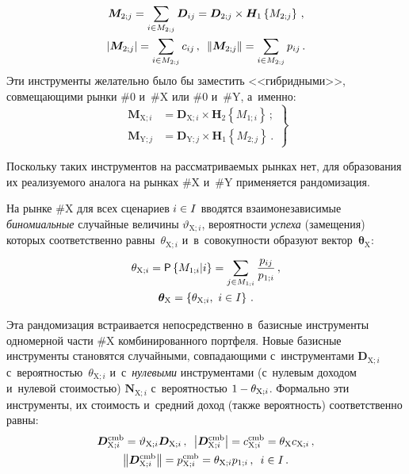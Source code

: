\begin{multicols}{2}
\noindent
\begin{multline*}
  \boldsymbol{M}_{2;j}= \sum\limits_{i\in 
M_{2;j}}\boldsymbol{D}_{ij}=\boldsymbol{D}_{2;j}\times 
\boldsymbol{H}_1\left\{ M_{2;j}\right\}\,,\\
  \left\vert \boldsymbol{M}_{2;j}\right\vert= \sum\limits_{i\in M_{2;j}} 
c_{ij}\,,\enskip  \left\| \boldsymbol{M}_{2;j}\right\| =
\sum\limits_{i\in M_{2;j}} 
p_{ij}\,.
    \end{multline*}
  Эти инструменты желательно было бы заместить <<гиб\-рид\-ны\-ми>>, 
совмещающими рынки \#0 и~\#X или \#0 и~\#Y, а~именно:
  \begin{equation}
  \left.
  \begin{array}{rl}
  \boldsymbol{M}_{\mathrm{X};i} &= \boldsymbol{D}_{\mathrm{X};i}\times 
\boldsymbol{H}_2\left\{ M_{1;i}\right\}\,;\\[6pt]
  \boldsymbol{M}_{\mathrm{Y};j} &= \boldsymbol{D}_{\mathrm{Y};j}\times 
\boldsymbol{H}_1\left\{ M_{2;j}\right\}\,.
  \end{array}
  \right\}
  \label{e10-ags}
  \end{equation}
  
  Поскольку таких инструментов на рассматриваемых рынках нет, для 
образования их реализуемого аналога на рынках \#X и~\#Y применяется 
рандомизация. 
  
  На рынке \#X для всех сценариев $i\hm\in I$ вводятся взаимонезависимые 
\textit{биномиальные} случайные величины $\vartheta_{\mathrm{X};i}$, 
вероятности \textit{успеха} (замещения) которых соответственно 
равны~$\theta_{\mathrm{X};i}$ и~в~совокупности образуют 
вектор~$\boldsymbol{\theta}_{\mathrm{X}}$:
  \begin{multline}
   \theta_{\mathrm{X};i} = {\sf P}\left\{ 
  M_{1;i}\vert i\right\} =\sum\limits_{j\in 
M_{1;i}} \displaystyle\frac{\displaystyle p_{ij}\mathstrut}{\displaystyle p_{1;i}\mathstrut}\,,\\
 \boldsymbol{\theta}_{\mathrm{X}}=\left\{ 
\theta_{\mathrm{X};i},\ i\in I\right\}\,.
  \label{e11-ags}
  \end{multline}
  
  Эта рандомизация встраивается непосредственно в~базисные инструменты 
одномерной части \#X комбинированного портфеля. Новые базисные 
инструменты становятся случайными, совпадающими с~инструментами 
$\boldsymbol{D}_{\mathrm{X};i}$ с~вероятностью~$\theta_{\mathrm{X};i}$ 
и~с~\textit{нулевыми} инструментами (с~нулевым доходом и~нулевой 
стоимостью) $\boldsymbol{N}_{\mathrm{X};i}$ с~вероятностью $1\hm- 
\theta_{\mathrm{X};i}$. Формально эти инструменты, их стоимость и~средний 
доход (также вероятность) соответственно равны: 
  \begin{multline}
   \boldsymbol{D}_{\mathrm{X};i}^{\mathrm{cmb}}=\vartheta_{\mathrm{X};i} 
\boldsymbol{D}_{\mathrm{X};i}\,,\enskip
  \left\vert  \boldsymbol{D}^{\mathrm{cmb}}_{\mathrm{X};i}\right\vert= 
c^{\mathrm{cmb}}_{\mathrm{X};i}=\theta_{\mathrm{X}} c_{\mathrm{X};i}\,,\\
  \left\| \boldsymbol{D}^{\mathrm{cmb}}_{\mathrm{X};i}\right\| =
  p^{\mathrm{cmb}}_{\mathrm{X};i} 
=\theta_{\mathrm{X};i} p_{1;i}\,,\enskip i\in I\,.
   \label{e12-ags}
  \end{multline}
  

\end{multicols}
